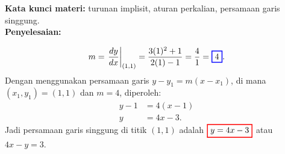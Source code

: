 \documentclass[10pt,openany,a4paper]{article}
\theoremstyle{definition}
\theoremstyle{definition}
\theoremstyle{plain}
\newenvironment{jawab}[2][tes]{%
\par\noindent\textbf{Kata kunci materi:} #1.\\
\textbf{Penyelesaian:} #2%
}{}
\begin{document}
\begin{enumerate}
\begin{jawab}[turunan implisit, aturan perkalian, persamaan garis singgung]
{\begin{enumerate}
\begin{align*}
                m=\left.\frac{dy}{dx}\right|_{(1,1)} = \frac{3(1)^2 + 1}{2(1) - 1}= \frac{4}{1}= \colorlet{oldcolor}{.}
        \color{blue}
        \setlength{\fboxrule}{1pt} \boxed{\color{oldcolor}4}\color{oldcolor}.
            \end{align*}
            Dengan menggunakan persamaan garis $y - y_1 = m(x - x_1)$, di mana $(x_1,y_1)=(1,1)$ dan $m=4$, diperoleh:
            \begin{align*}
                y - 1 &= 4(x - 1)\\
                y &= 4x - 3.
            \end{align*}
            Jadi persamaan garis singgung di titik $(1,1)$ adalah $\colorlet{oldcolor}{.}
        \color{red}
        \setlength{\fboxrule}{1pt} \boxed{\color{oldcolor}y = 4x - 3}\color{oldcolor}$ atau $4x-y=3$.
        \end{enumerate}
    }
    \end{jawab}
\end{enumerate}

\newpage
\end{document}
